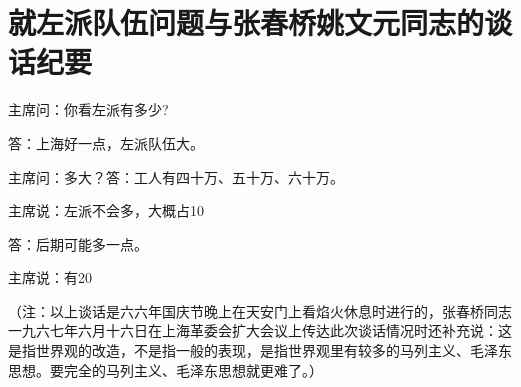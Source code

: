 \section[就左派队伍问题与张春桥姚文元同志的谈话纪要（一九六六年十月一日）]{就左派队伍问题与张春桥姚文元同志的谈话纪要}


主席问：你看左派有多少?

答：上海好一点，左派队伍大。

主席问：多大？答：工人有四十万、五十万、六十万。

主席说：左派不会多，大概占10%

答：后期可能多一点。

主席说：有20%

（注：以上谈话是六六年国庆节晚上在天安门上看焰火休息时进行的，张春桥同志一九六七年六月十六日在上海革委会扩大会议上传达此次谈话情况时还补充说：这是指世界观的改造，不是指一般的表现，是指世界观里有较多的马列主义、毛泽东思想。要完全的马列主义、毛泽东思想就更难了。）


